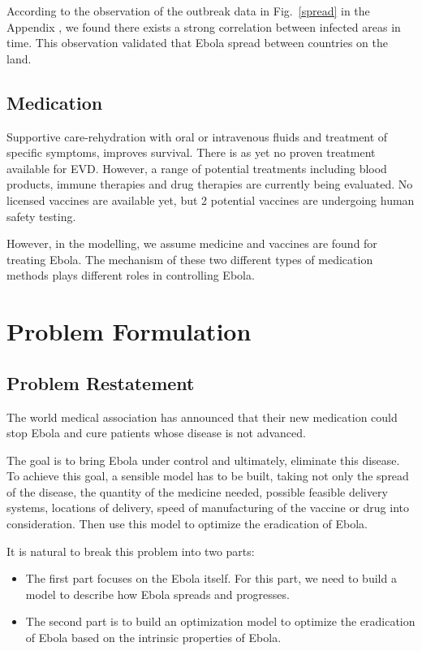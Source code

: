 \documentclass[11pt]{article}
\begin{document}
According to the observation of the outbreak data in Fig.~\ref{spread} in the Appendix , we found there exists a strong correlation  between infected areas in time. This observation validated that Ebola spread between countries on the land.



\subsection{Medication}

Supportive care-rehydration with oral or intravenous fluids and treatment of specific symptoms, improves survival. There is as yet no proven treatment available for EVD. However, a range of potential treatments including blood products, immune therapies and drug therapies are currently being evaluated. No licensed vaccines are available yet, but 2 potential vaccines are undergoing human safety testing.

However, in the modelling, we assume medicine and vaccines are found for treating Ebola. The mechanism of these two different types of medication methods plays different roles in controlling Ebola.


\section{Problem Formulation}



\subsection{Problem Restatement}

The world medical association has announced that their new medication could stop Ebola and cure patients whose disease is not advanced. 

The goal is to bring Ebola under control and ultimately, eliminate this disease. To achieve this goal, a sensible model has to be built, taking not only the spread of the disease, the quantity of the medicine needed, possible feasible delivery systems, locations of delivery, speed of manufacturing of the vaccine or drug into consideration. Then use this model to optimize the eradication of Ebola.

It is natural to break this problem into two parts:
\begin{itemize}
\item
 The first part focuses on the Ebola itself. For this part, we need to build a model to describe how Ebola spreads and progresses. 
\item
The second part is to build an optimization model to optimize the eradication of Ebola based on the intrinsic properties of Ebola. 

\end{itemize}
\end{document}
